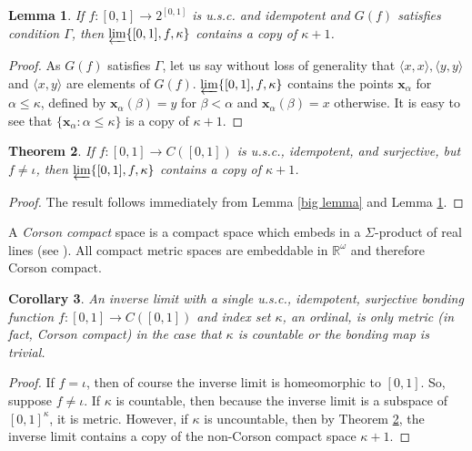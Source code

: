 \documentclass{amsart}
\newtheorem{theorem}{Theorem}[section]
\newtheorem{lemma}[theorem]{Lemma}
\newtheorem{corollary}[theorem]{Corollary}
\theoremstyle{definition}
\newcommand{\<}{\langle}
\renewcommand{\>}{\rangle}
\begin{document}
\begin{lemma} \label{general lemma}
If $f:[0,1] \to 2^{[0,1]}$ is u.s.c. and idempotent and $G(f)$ satisfies condition $\Gamma$, then $\varprojlim\{[0,1],f,\kappa\}$ contains a copy of $\kappa + 1$.
\end{lemma}

\begin{proof}
As $G(f)$ satisfies $\Gamma$, let us say without loss of generality that $\<x,x\>, \<y,y\>$ and $\<x,y\>$ are elements of $G(f)$. $\varprojlim\{[0,1],f,\kappa\}$ contains the points $\textbf{x}_\alpha$ for $\alpha\leq\kappa$, defined by $\textbf{x}_\alpha(\beta)=y$ for $\beta<\alpha$ and $\textbf{x}_\alpha(\beta)=x$ otherwise. It is easy to see that $\{\textbf{x}_\alpha:\alpha\leq\kappa\}$ is a copy of $\kappa+1$.
\end{proof}

\begin{theorem} \label{main theorem}
If $f:[0,1]\to C([0,1])$ is u.s.c., idempotent, and surjective, but $f\not=\iota$, then $\varprojlim\{[0,1],f,\kappa\}$ contains a copy of $\kappa+1$.
\end{theorem}

\begin{proof}
The result follows immediately from Lemma \ref{big lemma} and Lemma \ref{general lemma}.
\end{proof}

A \textit{Corson compact} space is a compact space which embeds in a $\Sigma$-product of real lines (see \cite{alster}). All compact metric spaces are embeddable in $\mathbb R^\omega$ and therefore Corson compact.

\begin{corollary} \label{main corr}
An inverse limit with a single u.s.c., idempotent, surjective bonding function $f: [0,1] \rightarrow C([0,1])$ and index set $\kappa$, an ordinal, is only metric (in fact, Corson compact) in the case that $\kappa$ is countable or the bonding map is trivial.
\end{corollary}

\begin{proof}
If $f = \iota$, then of course the inverse limit is homeomorphic to $[0,1]$. So, suppose $f \ne \iota$. If $\kappa$ is countable, then because the inverse limit is a subspace of $[0,1]^{\kappa}$, it is metric. However, if $\kappa$ is uncountable, then by Theorem \ref{main theorem}, the inverse limit contains a copy of the non-Corson compact space $\kappa + 1$.
\end{proof}
\end{document}
